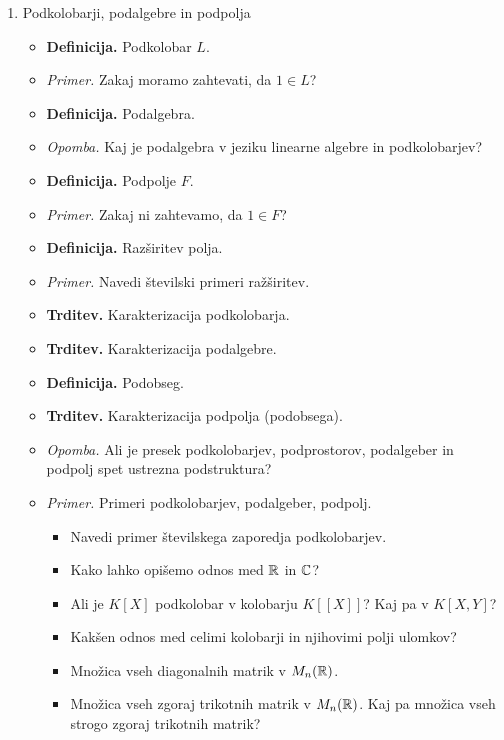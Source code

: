 \begin{enumerate}
    \item Podkolobarji, podalgebre in podpolja
    \begin{itemize}
        \item \colorbox{purple!30}{\textbf{Definicija.}} Podkolobar $L$.
        \item \colorbox{yellow!30}{\emph{Primer.}} Zakaj moramo zahtevati, da $1 \in L$?
        \item \colorbox{purple!30}{\textbf{Definicija.}} Podalgebra.
        \item \colorbox{yellow!30}{\emph{Opomba.}} Kaj je podalgebra v jeziku linearne algebre in podkolobarjev?
        \item \colorbox{purple!30}{\textbf{Definicija.}} Podpolje $F$.
        \item \colorbox{yellow!30}{\emph{Primer.}} Zakaj ni zahtevamo, da $1 \in F$?
        \item \colorbox{purple!30}{\textbf{Definicija.}} Razširitev polja.
        \item \colorbox{yellow!30}{\emph{Primer.}} Navedi številski primeri ražširitev.
        \item \colorbox{blue!30}{\textbf{Trditev.}} Karakterizacija podkolobarja.
        \item \colorbox{blue!30}{\textbf{Trditev.}} Karakterizacija podalgebre.
        \item \colorbox{purple!30}{\textbf{Definicija.}} Podobseg.
        \item \colorbox{blue!30}{\textbf{Trditev.}} Karakterizacija podpolja (podobsega).
        \item \colorbox{yellow!30}{\emph{Opomba.}} Ali je presek podkolobarjev, podprostorov, podalgeber in podpolj spet ustrezna podstruktura?
        \item \colorbox{yellow!30}{\emph{Primer.}} Primeri podkolobarjev, podalgeber, podpolj.        
        \begin{itemize}
            \item Navedi primer številskega zaporedja podkolobarjev.
            \item Kako lahko opišemo odnos med $\mathbb{R}$ in $\mathbb{C}$?
            \item Ali je $K[X]$ podkolobar v kolobarju $K[[X]]$? Kaj pa v $K[X, Y]$?
            \item Kakšen odnos med celimi kolobarji in njihovimi polji ulomkov?
            \item Množica vseh diagonalnih matrik v $M_n(\mathbb{R})$.
            \item Množica vseh zgoraj trikotnih matrik v $M_n(\mathbb{R})$. Kaj pa množica vseh strogo zgoraj trikotnih matrik?

\end{itemize}
\end{itemize}
\end{enumerate}
